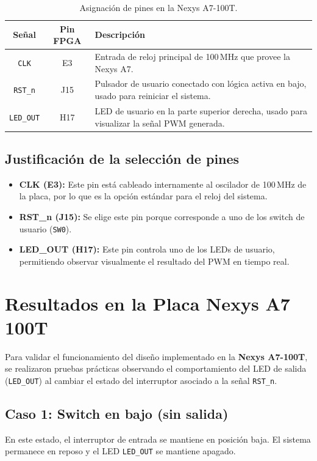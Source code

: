\documentclass[a4paper,12pt]{article}
\begin{document}
\begin{table}[H]
    \centering
    \renewcommand{\arraystretch}{1.2}
    \begin{tabularx}{0.75\textwidth}{|c|c|X|}
        \hline
        \textbf{Señal} & \textbf{Pin FPGA} & \textbf{Descripción} \\ \hline
        \texttt{CLK} & E3 & Entrada de reloj principal de 100\,MHz que provee la Nexys A7. \\ \hline
        \texttt{RST\_n} & J15 & Pulsador de usuario conectado con lógica activa en bajo, usado para reiniciar el sistema. \\ \hline
        \texttt{LED\_OUT} & H17 & LED de usuario en la parte superior derecha, usado para visualizar la señal PWM generada. \\ \hline
    \end{tabularx}
    \caption{Asignación de pines en la Nexys A7-100T.}
    \label{tab:asignacion_pines}
\end{table}

\subsection*{Justificación de la selección de pines}
\begin{itemize}
    \item \textbf{CLK (E3):} Este pin está cableado internamente al oscilador de 100\,MHz de la placa, por lo que es la opción estándar para el reloj del sistema.
    \item \textbf{RST\_n (J15):} Se elige este pin porque corresponde a uno de los switch de usuario (\texttt{SW0}).
    \item \textbf{LED\_OUT (H17):} Este pin controla uno de los LEDs de usuario, permitiendo observar visualmente el resultado del PWM en tiempo real.
\end{itemize}

\section{Resultados en la Placa Nexys A7 100T}

Para validar el funcionamiento del diseño implementado en la \textbf{Nexys A7-100T}, se realizaron pruebas prácticas observando el comportamiento del LED de salida (\texttt{LED\_OUT}) al cambiar el estado del interruptor asociado a la señal \texttt{RST\_n}.

\subsection*{Caso 1: Switch en bajo (sin salida)}
En este estado, el interruptor de entrada se mantiene en posición baja.  
El sistema permanece en reposo y el LED \texttt{LED\_OUT} se mantiene apagado.
\end{document}
